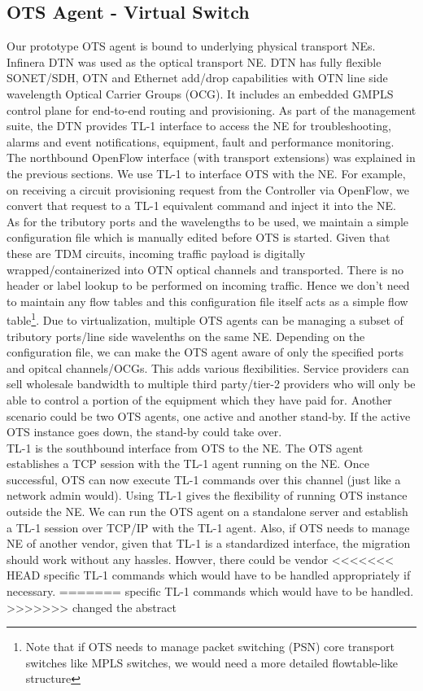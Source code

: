 \documentclass{sig-alternate-10pt}
\begin{document}
	\subsection{OTS Agent - Virtual Switch}
	\label{sec:otvs}
	Our prototype OTS agent is bound to underlying physical transport NEs. Infinera DTN \cite{dtn} was used
	as the optical transport NE. DTN has fully flexible SONET/SDH, OTN and Ethernet add/drop
	capabilities with OTN \cite{otn} line side wavelength Optical Carrier Groups (OCG). It includes an
	embedded GMPLS control plane for end-to-end routing and provisioning. As part of the management suite,
	the DTN provides TL-1 interface to access the NE for troubleshooting, alarms and event
	notifications, equipment, fault and performance monitoring. The northbound OpenFlow interface (with
	transport extensions) was explained in the previous sections. We use TL-1 to interface OTS with the NE.
	For example, on receiving a circuit provisioning request from the Controller via OpenFlow, we convert
	that request to a TL-1 equivalent command and inject it into the NE. \\

	As for the tributory ports and the wavelengths to be used, we maintain a simple configuration file which
	is manually edited before OTS is started. Given that these are TDM circuits, incoming traffic payload is
	digitally wrapped/containerized into OTN optical channels and transported. There is no header or label
	lookup to be performed on incoming traffic. Hence we don't need to maintain any flow tables and this
	configuration file itself acts as a simple flow table\footnote{Note that if OTS needs to manage packet
	switching (PSN) core transport switches like MPLS switches, we would need a more detailed flowtable-like
	structure}. Due to virtualization, multiple OTS agents can be managing a subset of tributory ports/line
	side wavelenths on the same NE. Depending on the configuration file, we can make the OTS agent aware of
	only the specified ports and opitcal channels/OCGs. This adds various flexibilities. Service providers
	can sell wholesale bandwidth to multiple third party/tier-2 providers who will only be able to control a
	portion of the equipment which they have paid for. Another scenario could be two OTS agents, one active
	and another stand-by. If the active OTS instance goes down, the stand-by could take over.\\

	TL-1 is the southbound interface from OTS to the NE. The OTS agent establishes a TCP session with
	the TL-1 agent running on the NE. Once successful, OTS can now execute TL-1 commands over this
	channel (just like a network admin would). Using TL-1 gives the flexibility of running OTS instance
	outside the NE. We can run the OTS agent on a standalone server and establish a TL-1 session over
	TCP/IP with the TL-1 agent. Also, if OTS needs to manage NE of another vendor, given that TL-1 is a
	standardized interface, the migration should work without any hassles. Howver, there could be vendor 
<<<<<<< HEAD
	specific TL-1 commands which would have to be handled appropriately if necessary.
=======
	specific TL-1 commands which would have to be handled.
>>>>>>> changed the abstract
\end{document}
